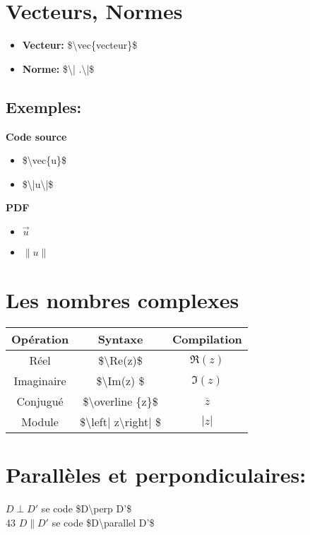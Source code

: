 \documentclass[a4paper,12pt]{article}
\begin{document}
\section{Vecteurs, Normes}
\begin{itemize}
\item \textbf{ Vecteur:} \$\textbackslash vec\{vecteur\}\$
\item \textbf{Norme:} \$\textbackslash| .\textbackslash|\$
\end{itemize}
\subsection{Exemples:}
\begin{minipage}[t]{8cm}	
\textbf{Code source}\\
\begin{itemize}
\item \$\textbackslash vec\{u\}\$
\item \$\textbackslash|u\textbackslash|\$
\end{itemize}
\end{minipage}
\hspace{0.3cm}
\begin{minipage}[t]{8cm}
\textbf{PDF}\\
\begin{itemize}
\item $\vec{u}$
\item $\|u\|$
\end{itemize}
\end{minipage}
\section{Les nombres complexes}
\begin{tabular}{|c|c|c|}
	\hline Op\'eration & Syntaxe & Compilation\\
	\hline R\'eel & \$\textbackslash Re(z)\$ & $\Re(z)$\\
	\hline Imaginaire & \$\textbackslash Im(z) \$ & $\Im(z)$\\
	\hline Conjugu\'e & \$\textbackslash overline \{z\}\$ & $\overline{z}$\\
	\hline Module & \$\textbackslash left| z\textbackslash right| \$ & $\left| z \right|$\\
	\hline
\end{tabular}
\section{Parall\`eles et perpondiculaires:}
 $D\perp D'$ se code \$D\textbackslash perp D'\$\\
 {43} $D\parallel D'$ se code \$D\textbackslash parallel D'\$
\end{document}
